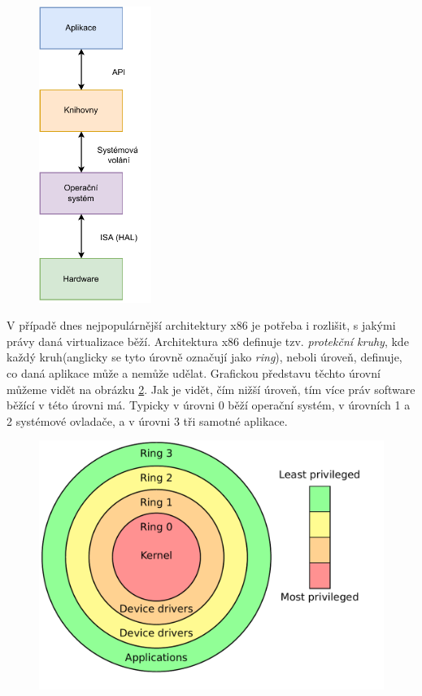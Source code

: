 \begin{figure}[htbp]
    \centering 
    \includegraphics[width=0.325\textwidth]{assets/img/computer_stack.pdf}
    \label{fig:pc_stack}
\end{figure}

V případě dnes nejpopulárnější architektury x86 je potřeba i rozlišit, s jakými právy daná virtualizace běží. Architektura x86 definuje tzv. \textit{protekční kruhy}, kde každý kruh(anglicky se tyto úrovně označují jako \textit{ring}), neboli úroveň, definuje, co daná aplikace může a nemůže udělat. Grafickou představu těchto úrovní můžeme vidět na obrázku \ref{fig:priv_rings}. Jak je vidět, čím nižší úroveň, tím více práv software běžící v této úrovni má. Typicky v úrovni 0 běží operační systém, v úrovních 1 a 2 systémové ovladače, a v úrovni 3 tři samotné aplikace.\,\cite{RODRIGUEZHARO2012267}

\begin{figure}[htbp]
    \centering 
    \includegraphics[width=\textwidth]{assets/img/priv_rings.pdf}
    \label{fig:priv_rings}
\end{figure}

